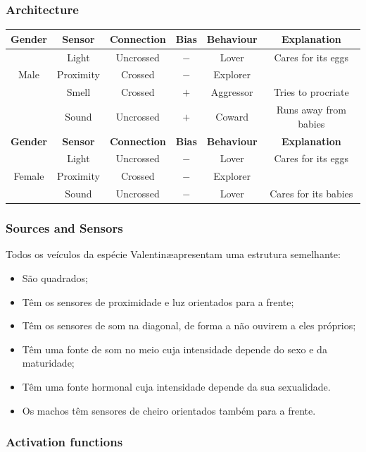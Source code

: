 \documentclass[a4paper]{article}
\begin{document}
\subsubsection{Architecture}
\begin{tabular}{| c | c | c | c | c | c |}
 \hline
  \textbf{Gender} & \textbf{Sensor} & \textbf{Connection} & \textbf{Bias} & \textbf{Behaviour} & \textbf{Explanation} \\
 \hline
  & Light & Uncrossed & $-$ & Lover & Cares for its eggs \\
  Male & Proximity & Crossed & $-$ & Explorer &  \\
  & Smell & Crossed & $+$ & Aggressor & Tries to procriate \\
  & Sound & Uncrossed & $+$ & Coward & Runs away from babies \\
 \hline
  \textbf{Gender} & \textbf{Sensor} & \textbf{Connection} & \textbf{Bias} & \textbf{Behaviour} & \textbf{Explanation} \\
 \hline
  & Light & Uncrossed & $-$ & Lover & Cares for its eggs \\
  Female & Proximity & Crossed & $-$ & Explorer &  \\
  & Sound & Uncrossed & $-$ & Lover & Cares for its babies \\
 \hline
\end{tabular}

\subsubsection{Sources and Sensors}
\indent \indent Todos os veículos da espécie Valentin\ae apresentam uma estrutura semelhante:
\begin{itemize}
\item São quadrados;
\item Têm os sensores de proximidade e luz orientados para a frente;
\item Têm os sensores de som na diagonal, de forma a não ouvirem a eles próprios;
\item Têm uma fonte de som no meio cuja intensidade depende do sexo e da maturidade;
\item Têm uma fonte hormonal cuja intensidade depende da sua sexualidade.
\item Os machos têm sensores de cheiro orientados também para a frente.  
\end{itemize}

\cleardoublepage
\subsubsection{Activation functions}
\end{document}
